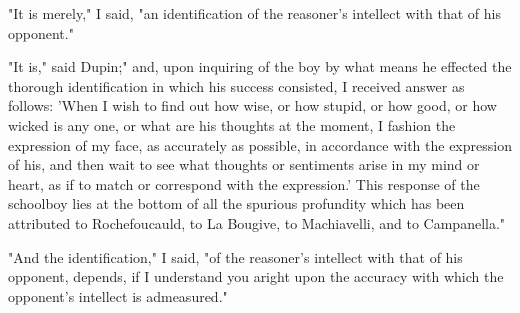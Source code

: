 \documentclass{article}
\begin{document}
"It is merely," I said, "an identification of the reasoner's intellect with that of his opponent."

"It is," said Dupin;" and, upon inquiring of the boy by what means he effected the thorough identification in which his success consisted, I received answer as follows: 'When I wish to find out how wise, or how stupid, or how good, or how wicked is any one, or what are his thoughts at the moment, I fashion the expression of my face, as accurately as possible, in accordance with the expression of his, and then wait to see what thoughts or sentiments arise in my mind or heart, as if to match or correspond with the expression.' This response of the schoolboy lies at the bottom of all the spurious profundity which has been attributed to Rochefoucauld, to La Bougive, to Machiavelli, and to Campanella."

"And the identification," I said, "of the reasoner's intellect with that of his opponent, depends, if I understand you aright upon the accuracy with which the opponent's intellect is admeasured."
\end{document}
